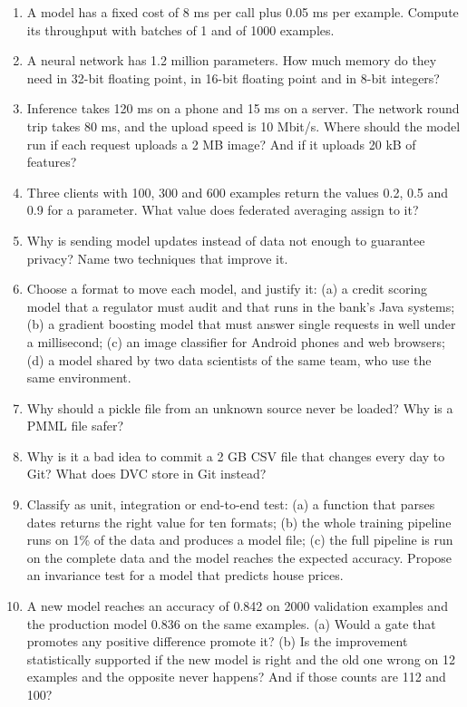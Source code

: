 \begin{enumerate}[label=\textbf{5.\arabic*},ref=5.\arabic*,leftmargin=*,itemsep=6pt]
  \item\label{exr5:batch} A model has a fixed cost of 8 ms per call plus 0.05 ms per example. Compute its
        throughput with batches of 1 and of 1000 examples.
  \item\label{exr5:quant} A neural network has 1.2 million parameters. How much memory do they need in 32-bit
        floating point, in 16-bit floating point and in 8-bit integers?
  \item\label{exr5:latency} Inference takes 120 ms on a phone and 15 ms on a server. The network round trip
        takes 80 ms, and the upload speed is 10 Mbit/s. Where should the model run if each request uploads a
        2 MB image? And if it uploads 20 kB of features?
  \item\label{exr5:fedavg} Three clients with 100, 300 and 600 examples return the values 0.2, 0.5 and 0.9 for a
        parameter. What value does federated averaging assign to it?
  \item\label{exr5:privacy} Why is sending model updates instead of data not enough to guarantee privacy? Name two
        techniques that improve it.
  \item\label{exr5:format} Choose a format to move each model, and justify it: (a) a credit scoring model
        that a regulator must audit and that runs in the bank's Java systems; (b) a gradient boosting model
        that must answer single requests in well under a millisecond; (c) an image classifier for Android
        phones and web browsers; (d) a model shared by two data scientists of the same team, who use the
        same environment.
  \item\label{exr5:pickle} Why should a pickle file from an unknown source never be loaded? Why is a PMML
        file safer?
  \item\label{exr5:dvc} Why is it a bad idea to commit a 2 GB CSV file that changes every day to Git? What does
        DVC store in Git instead?
  \item\label{exr5:tests} Classify as unit, integration or end-to-end test: (a) a function that parses dates
        returns the right value for ten formats; (b) the whole training pipeline runs on 1\% of the data and
        produces a model file; (c) the full pipeline is run on the complete data and the model reaches the
        expected accuracy. Propose an invariance test for a model that predicts house prices.
  \item\label{exr5:gate} A new model reaches an accuracy of 0.842 on 2000 validation examples and the production
        model 0.836 on the same examples. (a) Would a gate that promotes any positive difference promote it?
        (b) Is the improvement statistically supported if the new model is right and the old one wrong on 12
        examples and the opposite never happens? And if those counts are 112 and 100?


\end{enumerate}
